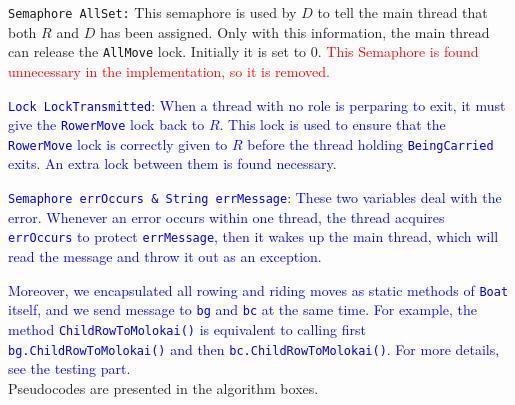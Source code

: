 \documentclass{article}
\begin{document}
\begin{spacing}{1.1}
\begin{asparaitem}
  \item \texttt{Semaphore AllSet:} This semaphore is used by $D$ to tell the main thread that both $R$ and $D$ has been assigned. Only with this information, the main thread can release the \texttt{AllMove} lock. Initially it is set to 0. \textcolor{red}{This Semaphore is found unnecessary in the implementation, so it is removed.}\\
  \item \textcolor{blue}{\texttt{Lock LockTransmitted}: When a thread with no role is perparing to exit, it must give the \texttt{RowerMove} lock back to $R$. This lock is used to ensure that the \texttt{RowerMove} lock is correctly given to $R$ before the thread holding \texttt{BeingCarried} exits. An extra lock between them is found necessary.}\\
  \item \textcolor{blue}{\texttt{Semaphore errOccurs \& String errMessage}: These two variables deal with the error. Whenever an error occurs within one thread, the thread acquires \texttt{errOccurs} to protect \texttt{errMessage}, then it wakes up the main thread, which will read the message and throw it out as an exception.}\\
\end{asparaitem}

\textcolor{blue}{Moreover, we encapsulated all rowing and riding moves as static methods of \texttt{Boat} itself, and we send message to \texttt{bg} and \texttt{bc} at the same time. For example, the method \texttt{ChildRowToMolokai()} is equivalent to calling first \texttt{bg.ChildRowToMolokai()} and then \texttt{bc.ChildRowToMolokai()}. For more details, see the testing part.}\\

Pseudocodes are presented in the algorithm boxes.\\


\end{spacing}
\end{document}
